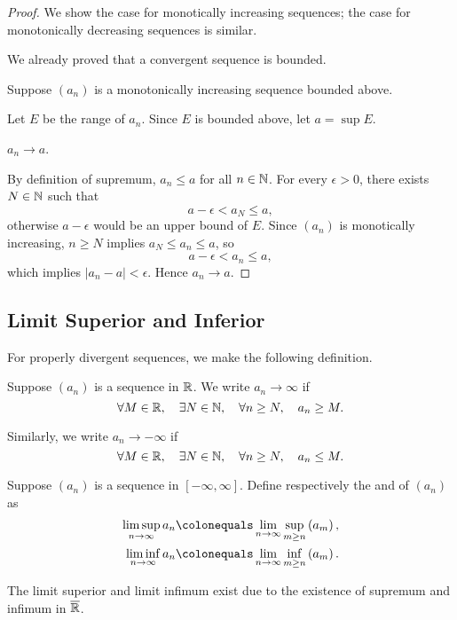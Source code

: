 \begin{proof}
We show the case for monotically increasing sequences; the case for monotonically decreasing sequences is similar.

\fbox{$\implies$} We already proved that a convergent sequence is bounded.

\fbox{$\impliedby$} Suppose $(a_n)$ is a monotonically increasing sequence bounded above. 

Let $E$ be the range of $a_n$. Since $E$ is bounded above, let $a=\sup E$.
\begin{claim}
$a_n\to a$.
\end{claim}
By definition of supremum, $a_n\le a$ for all $n\in\mathbb N$. For every $\epsilon>0$, there exists $N\in\mathbb N$ such that
\[a-\epsilon<a_N\le a,\]
otherwise $a-\epsilon$ would be an upper bound of $E$. Since $(a_n)$ is monotically increasing, $n\ge N$ implies $a_N\le a_n\le a$, so 
\[a-\epsilon<a_n\le a,\]
which implies $|a_n-a|<\epsilon$. Hence $a_n\to a$.
\end{proof}
\pagebreak

\subsection{Limit Superior and Inferior}
For properly divergent sequences, we make the following definition.
\begin{definition}
Suppose $(a_n)$ is a sequence in $\mathbb R$. We write $a_n\to\infty$ if
\[\forall M\in\mathbb R,\quad\exists N\in\mathbb N,\quad\forall n\ge N,\quad a_n\ge M.\]

Similarly, we write $a_n\to-\infty$ if 
\[\forall M\in\mathbb R,\quad\exists N\in\mathbb N,\quad\forall n\ge N,\quad a_n\le M.\]
\end{definition}

\begin{definition}
Suppose $(a_n)$ is a sequence in $[-\infty,\infty]$. Define respectively the  and  of $(a_n)$ as
\begin{align*}
\limsup_{n\to\infty}a_n&\colonequals\lim_{n\to\infty}\sup_{m\ge n}\brac{a_m},\\
\liminf_{n\to\infty}a_n&\colonequals\lim_{n\to\infty}\inf_{m\ge n}\brac{a_m}.
\end{align*}
\end{definition}

\begin{remark}
The limit superior and limit infimum exist due to the existence of supremum and infimum in $\overline{\mathbb R}$.
\end{remark}

